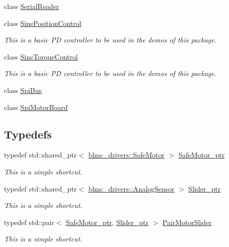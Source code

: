 \begin{DoxyCompactItemize}
class \hyperlink{classblmc__drivers_1_1SerialReader}{Serial\+Reader}
\item 
class \hyperlink{classblmc__drivers_1_1SinePositionControl}{Sine\+Position\+Control}
\begin{DoxyCompactList}\small\item\em This is a basic PD controller to be used in the demos of this package. \end{DoxyCompactList}\item 
class \hyperlink{classblmc__drivers_1_1SineTorqueControl}{Sine\+Torque\+Control}
\begin{DoxyCompactList}\small\item\em This is a basic PD controller to be used in the demos of this package. \end{DoxyCompactList}\item 
class \hyperlink{classblmc__drivers_1_1SpiBus}{Spi\+Bus}
\item 
class \hyperlink{classblmc__drivers_1_1SpiMotorBoard}{Spi\+Motor\+Board}
\end{DoxyCompactItemize}
\subsection*{Typedefs}
\begin{DoxyCompactItemize}
\item 
\mbox{\label{namespaceblmc__drivers_ab975c3be3c53a93a10c491f07a132e2b}} 
typedef std\+::shared\+\_\+ptr$<$ \hyperlink{classblmc__drivers_1_1SafeMotor}{blmc\+\_\+drivers\+::\+Safe\+Motor} $>$ \hyperlink{namespaceblmc__drivers_ab975c3be3c53a93a10c491f07a132e2b}{Safe\+Motor\+\_\+ptr}
\begin{DoxyCompactList}\small\item\em This is a simple shortcut. \end{DoxyCompactList}\item 
\mbox{\label{namespaceblmc__drivers_a1eb492ab42b913d5bcc21d53ba7185ba}} 
typedef std\+::shared\+\_\+ptr$<$ \hyperlink{classblmc__drivers_1_1AnalogSensor}{blmc\+\_\+drivers\+::\+Analog\+Sensor} $>$ \hyperlink{namespaceblmc__drivers_a1eb492ab42b913d5bcc21d53ba7185ba}{Slider\+\_\+ptr}
\begin{DoxyCompactList}\small\item\em This is a simple shortcut. \end{DoxyCompactList}\item 
\mbox{\label{namespaceblmc__drivers_a134270c90d29a9a28b64ab0e5f7158f7}} 
typedef std\+::pair$<$ \hyperlink{namespaceblmc__drivers_ab975c3be3c53a93a10c491f07a132e2b}{Safe\+Motor\+\_\+ptr}, \hyperlink{namespaceblmc__drivers_a1eb492ab42b913d5bcc21d53ba7185ba}{Slider\+\_\+ptr} $>$ \hyperlink{namespaceblmc__drivers_a134270c90d29a9a28b64ab0e5f7158f7}{Pair\+Motor\+Slider}
\begin{DoxyCompactList}\small\item\em This is a simple shortcut. \end{DoxyCompactList}\end{DoxyCompactItemize}
